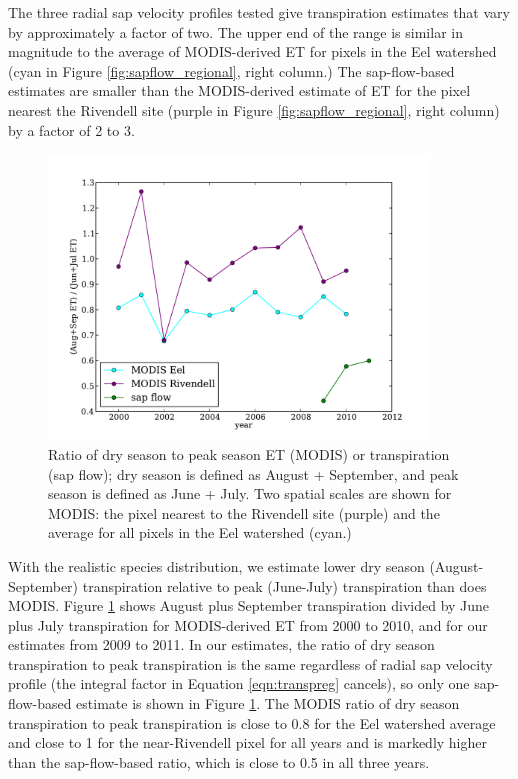 The three radial sap velocity profiles tested give transpiration estimates that vary by approximately a factor of two.  The upper end of the range is similar in magnitude to the average of MODIS-derived ET for pixels in the Eel watershed (cyan in Figure \ref{fig:sapflow_regional}, right column.)  The sap-flow-based estimates are smaller than the MODIS-derived estimate of ET for the pixel nearest the Rivendell site (purple in Figure \ref{fig:sapflow_regional}, right column) by a factor of 2 to 3.

\begin{figure}[here]
\includegraphics[width=0.9\textwidth]{ch1-sapflow/figures/Figure11.pdf}
\caption{Ratio of dry season to peak season ET (MODIS) or transpiration (sap flow); dry season is defined as August + September, and peak season is defined as June + July.  Two spatial scales are shown for MODIS: the pixel nearest to the Rivendell site (purple) and the average for all pixels in the Eel watershed (cyan.)}
\label{fig:sapflow_ratio}
\end{figure}

With the realistic species distribution, we estimate lower dry season (August-September) transpiration relative to peak (June-July) transpiration than does MODIS.  Figure \ref{fig:sapflow_ratio} shows August plus September transpiration divided by June plus July transpiration for MODIS-derived ET from 2000 to 2010, and for our estimates from 2009 to 2011.  In our estimates, the ratio of dry season transpiration to peak transpiration is the same regardless of radial sap velocity profile (the integral factor in Equation \ref{eqn:transpreg} cancels), so only one sap-flow-based estimate is shown in Figure \ref{fig:sapflow_ratio}.  The MODIS ratio of dry season transpiration to peak transpiration is close to 0.8 for the Eel watershed average and close to 1 for the near-Rivendell pixel for all years and is markedly higher than the sap-flow-based ratio, which is close to 0.5 in all three years.


